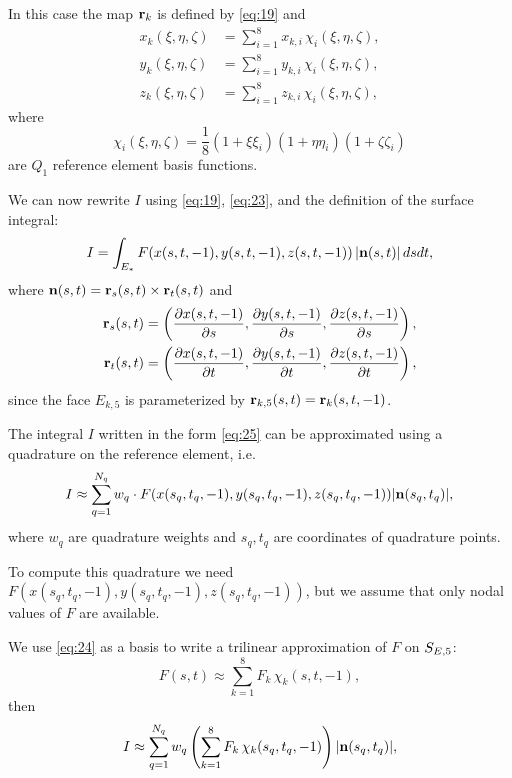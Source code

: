 \documentclass[11pt]{article}
\begin{document}
In this case the map $\mathbf{r}_{k}$ is defined by \eqref{eq:19} and
\begin{equation}
\label{eq:23}
\begin{aligned}
x_{k}(\xi,\eta,\zeta) &= \sum_{i=1}^{8} x_{k,i}\, \chi_{i}(\xi, \eta, \zeta),\\
y_{k}(\xi,\eta,\zeta) &= \sum_{i=1}^{8} y_{k,i}\, \chi_{i}(\xi, \eta, \zeta),\\
z_{k}(\xi,\eta,\zeta) &= \sum_{i=1}^{8} z_{k,i}\, \chi_{i}(\xi, \eta, \zeta),
\end{aligned}
\end{equation}
where
\begin{equation}
\label{eq:24}
\chi_{i}(\xi,\eta,\zeta) = \frac18 (1 + \xi\xi_{i})(1 + \eta\eta_{i})(1 + \zeta\zeta_{i})
\end{equation}
are $Q_{1}$ reference element basis functions.

We can now rewrite $I$ using \eqref{eq:19}, \eqref{eq:23}, and the definition of the surface integral:
\begin{equation}
\label{eq:25}
I = \int_{E_{*}} F(x(s,t,-1), y(s,t,-1), z(s,t,-1))\, | \mathbf{n}(s,t) |\,dsdt,
\end{equation}
where $\mathbf{n}(s,t) = \mathbf{r}_{s}(s,t) \times \mathbf{r}_{t}(s,t)$ and
\begin{equation}
\label{eq:26}
\begin{aligned}
\mathbf{r}_{s}(s,t) &= \left(\frac{\partial x(s,t,-1)}{\partial s}, \frac{\partial y(s,t,-1)}{\partial s}, \frac{\partial z(s,t,-1)}{\partial s}\right),\\
\mathbf{r}_{t}(s,t) &= \left(\frac{\partial x(s,t,-1)}{\partial t}, \frac{\partial y(s,t,-1)}{\partial t}, \frac{\partial z(s,t,-1)}{\partial t}\right),
\end{aligned}
\end{equation}
since the face $E_{k,5}$ is parameterized by $\mathbf{r}_{k,5}(s, t) = \mathbf{r}_{k}(s, t, -1)$.

The integral $I$ written in the form \eqref{eq:25} can be approximated
using a quadrature on the reference element, i.e.
\begin{equation}
\label{eq:27}
I \approx \sum_{q=1}^{N_{q}} w_{q}\cdot F(x(s_{q},t_{q},-1), y(s_{q},t_{q},-1), z(s_{q},t_{q},-1)) | \mathbf{n}(s_{q},t_{q}) |,
\end{equation}
where $w_{q}$ are quadrature weights and $s_{q}, t_{q}$ are
coordinates of quadrature points.

To compute this quadrature we need
$F(x(s_{q},t_{q},-1), y(s_{q},t_{q},-1), z(s_{q},t_{q},-1))$, but we
assume that only nodal values of $F$ are available.

We use \eqref{eq:24} as a basis to write a trilinear approximation of $F$ on $S_{E,5}$:
\begin{equation}
\label{eq:28}
F(s,t) \approx \sum_{k=1}^{8} F_{k}\,\chi_{k}(s, t, -1),
\end{equation}
then
\begin{equation}
\label{eq:29}
I \approx \sum_{q=1}^{N_{q}} w_{q}\left( \sum_{k=1}^{8} F_{k}\,\chi_{k}(s_{q}, t_{q}, -1) \right) | \mathbf{n}(s_{q},t_{q}) |,
\end{equation}
\end{document}
